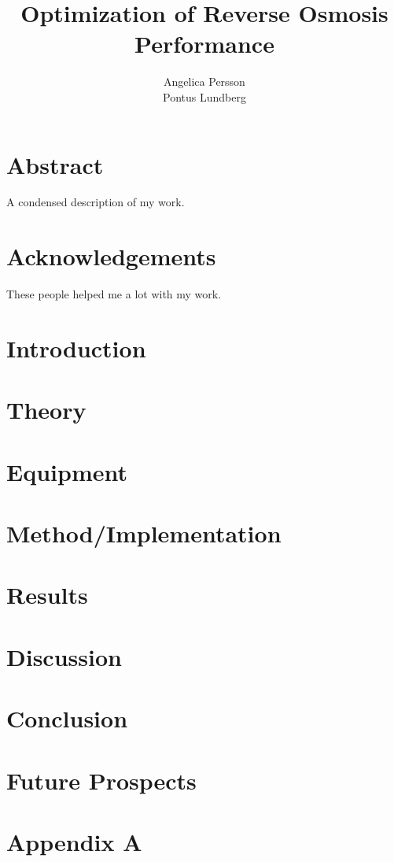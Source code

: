 \documentclass{LTHthesis}
\begin{document}
\begin{titlepages}
\author{Angelica Persson \\ Pontus Lundberg}
\title{Optimization of Reverse Osmosis Performance}
\end{titlepages}
\chapter*{Abstract}
A condensed description of my work.
\chapter*{Acknowledgements}
These people helped me a lot with my work.

\tableofcontents





\chapter{Introduction}



\chapter{Theory}


\chapter{Equipment}


\chapter{Method/Implementation}


\chapter{Results}


\chapter{Discussion}


\chapter{Conclusion}


\chapter{Future Prospects}


\printbibliography 
\clearpage
\appendix
\chapter{Appendix A} 
\label{A}
%
\end{document}
